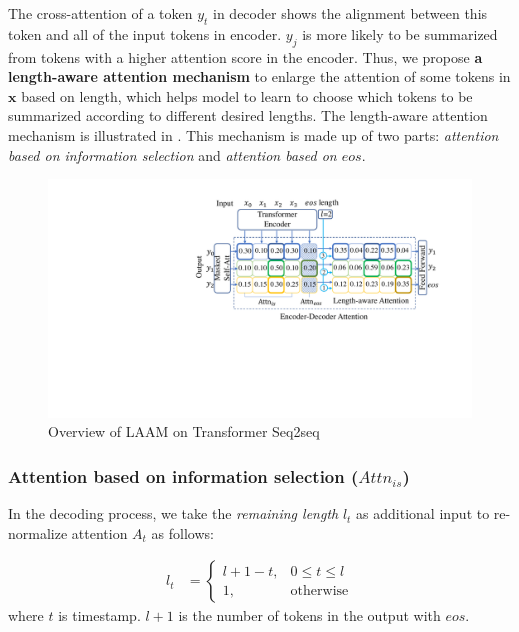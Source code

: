 The cross-attention of a token $y_t$ in decoder shows 
the alignment between this token and all of the input tokens in encoder.
$y_j$ is more likely to be summarized from tokens with a higher attention score in the encoder.
Thus, we propose {\bf a length-aware attention mechanism} to enlarge the attention of some tokens in $\textbf{x}$ based on length, which helps model to learn to choose which tokens to be summarized according to different desired lengths.
The length-aware attention mechanism is illustrated in .
This mechanism is made up of two parts: {\em attention based on information selection} and 
{\em attention based on $eos$}.
 
\begin{figure}[th]
	\centering
	\includegraphics[width=1.0\linewidth]{model.pdf}
	\caption{Overview of LAAM on Transformer Seq2seq}
	\label{fig:model_main}
\end{figure}


\subsubsection{Attention based on information selection ($Attn_{is}$)}
In the decoding process,
we take the {\em remaining length} $l_t$
as additional input to re-normalize attention $A_{t}$ as follows:

 \begin{align}
        l_t &=		
		\begin{cases}			
			l+1-t, &\mbox{$0\leq t \leq l$}\\			
			1, &\mbox{otherwise}			
		\end{cases}		
\end{align}
where $t$ is timestamp. 
$l+1$ is the number of tokens in the output with $eos$.

